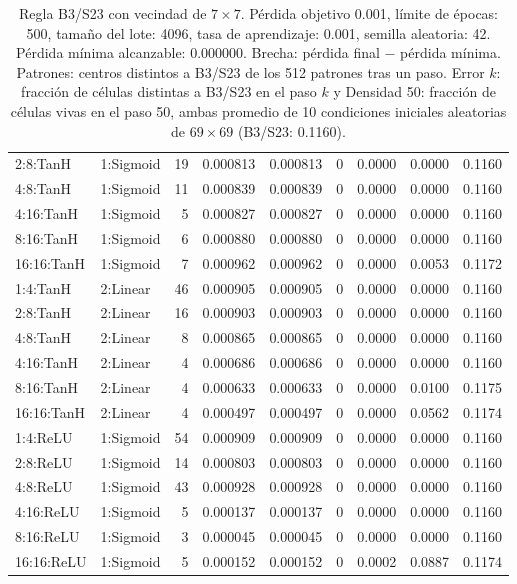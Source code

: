 \begin{table}[H]
\begin{tabular}{llrrrrrrr}
		2:8:TanH & 1:Sigmoid & 19 & 0.000813 & 0.000813 & 0 & 0.0000 & 0.0000 & 0.1160 \\
		4:8:TanH & 1:Sigmoid & 11 & 0.000839 & 0.000839 & 0 & 0.0000 & 0.0000 & 0.1160 \\
		4:16:TanH & 1:Sigmoid & 5 & 0.000827 & 0.000827 & 0 & 0.0000 & 0.0000 & 0.1160 \\
		8:16:TanH & 1:Sigmoid & 6 & 0.000880 & 0.000880 & 0 & 0.0000 & 0.0000 & 0.1160 \\
		16:16:TanH & 1:Sigmoid & 7 & 0.000962 & 0.000962 & 0 & 0.0000 & 0.0053 & 0.1172 \\
		\midrule
		1:4:TanH & 2:Linear & 46 & 0.000905 & 0.000905 & 0 & 0.0000 & 0.0000 & 0.1160 \\
		2:8:TanH & 2:Linear & 16 & 0.000903 & 0.000903 & 0 & 0.0000 & 0.0000 & 0.1160 \\
		4:8:TanH & 2:Linear & 8 & 0.000865 & 0.000865 & 0 & 0.0000 & 0.0000 & 0.1160 \\
		4:16:TanH & 2:Linear & 4 & 0.000686 & 0.000686 & 0 & 0.0000 & 0.0000 & 0.1160 \\
		8:16:TanH & 2:Linear & 4 & 0.000633 & 0.000633 & 0 & 0.0000 & 0.0100 & 0.1175 \\
		16:16:TanH & 2:Linear & 4 & 0.000497 & 0.000497 & 0 & 0.0000 & 0.0562 & 0.1174 \\
		\midrule
		1:4:ReLU & 1:Sigmoid & 54 & 0.000909 & 0.000909 & 0 & 0.0000 & 0.0000 & 0.1160 \\
		2:8:ReLU & 1:Sigmoid & 14 & 0.000803 & 0.000803 & 0 & 0.0000 & 0.0000 & 0.1160 \\
		4:8:ReLU & 1:Sigmoid & 43 & 0.000928 & 0.000928 & 0 & 0.0000 & 0.0000 & 0.1160 \\
		4:16:ReLU & 1:Sigmoid & 5 & 0.000137 & 0.000137 & 0 & 0.0000 & 0.0000 & 0.1160 \\
		8:16:ReLU & 1:Sigmoid & 3 & 0.000045 & 0.000045 & 0 & 0.0000 & 0.0000 & 0.1160 \\
		16:16:ReLU & 1:Sigmoid & 5 & 0.000152 & 0.000152 & 0 & 0.0002 & 0.0887 & 0.1174 \\
		\bottomrule
	\end{tabular}
	\caption{Regla B3/S23 con vecindad de $7\times7$. Pérdida objetivo 0.001, límite de épocas: 500, tamaño del lote: 4096, tasa de aprendizaje: 0.001, semilla aleatoria: 42. Pérdida mínima alcanzable: 0.000000. Brecha: pérdida final $-$ pérdida mínima. Patrones: centros distintos a B3/S23 de los 512 patrones tras un paso. Error $k$: fracción de células distintas a B3/S23 en el paso $k$ y Densidad 50: fracción de células vivas en el paso 50, ambas promedio de 10 condiciones iniciales aleatorias de $69\times69$ (B3/S23: 0.1160).}
	\label{tab:vecindad_7x7}
\end{table}

